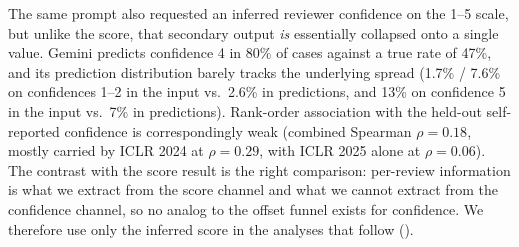 \documentclass{article}
\begin{document}
The same prompt also requested an inferred reviewer confidence on the 1--5 scale, but unlike the score, that secondary output \emph{is} essentially collapsed onto a single value. Gemini predicts confidence 4 in 80\% of cases against a true rate of 47\%, and its prediction distribution barely tracks the underlying spread (1.7\% / 7.6\% on confidences 1--2 in the input vs.\ 2.6\% in predictions, and 13\% on confidence 5 in the input vs.\ 7\% in predictions). Rank-order association with the held-out self-reported confidence is correspondingly weak (combined Spearman $\rho = 0.18$, mostly carried by ICLR 2024 at $\rho = 0.29$, with ICLR 2025 alone at $\rho = 0.06$). The contrast with the score result is the right comparison: per-review information is what we extract from the score channel and what we cannot extract from the confidence channel, so no analog to the offset funnel exists for confidence. We therefore use only the inferred score in the analyses that follow ().
\end{document}
